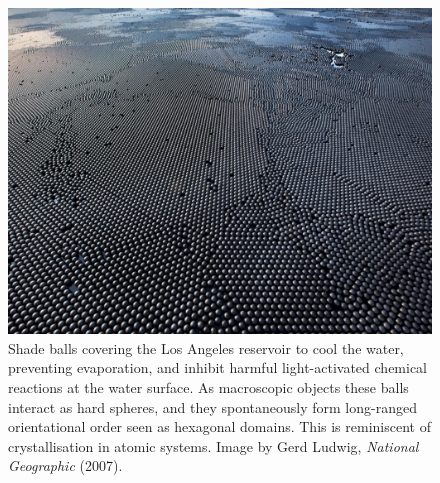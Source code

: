 \documentclass[11pt,twoside]{report}
\begin{document}
\begin{figure}
  \includegraphics[width=0.75\linewidth,outer]{shade-balls}
  \caption[Shade balls floating on water: a 2d `crystal']{
    Shade balls covering the Los Angeles reservoir to cool the water, preventing evaporation, and inhibit harmful light-activated chemical reactions at the water surface.
    As macroscopic objects these balls interact as hard spheres, and they spontaneously form long-ranged orientational order seen as hexagonal domains.
    This is reminiscent of crystallisation in atomic systems.
    Image by Gerd Ludwig, \emph{National Geographic} (2007).}
  \label{fig:shade-balls}
\end{figure}


\end{document}
